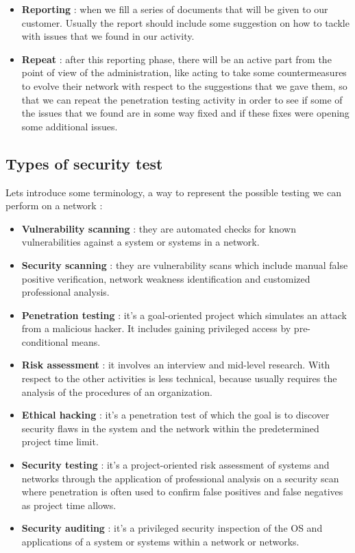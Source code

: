 \documentclass[11pt]{article}
\begin{document}
\begin{itemize}
\item \textbf{Reporting} : when we fill a series of documents that will be given to our customer. Usually the report should include some suggestion on how to tackle with issues that we found in our activity. 
\item \textbf{Repeat} : after this reporting phase, there will be an active part from the point of view of the administration, like acting to take some countermeasures to evolve their network with respect to the suggestions that we gave them, so that we can repeat the penetration testing activity in order to see if some of the issues that we found are in some way fixed and if these fixes were opening some additional issues.
\end{itemize}
\subsection{Types of security test}
Lets introduce some terminology, a way to represent the possible testing we can perform on a network :
\begin{itemize}
\item \textbf{Vulnerability scanning} : they are automated checks for known vulnerabilities against a system or systems in a network.
\item \textbf{Security scanning} : they are vulnerability scans which include manual false positive verification, network weakness identification and customized professional analysis.
\item \textbf{Penetration testing} : it's a goal-oriented project which simulates an attack from a malicious hacker. It includes gaining privileged access by pre-conditional means.
\item \textbf{Risk assessment} : it involves an interview and mid-level research. With respect to the other activities is less technical, because usually requires the analysis of the procedures of an organization.
\item \textbf{Ethical hacking} : it's a penetration test of which the goal is to discover security flaws in the system and the network within the predetermined project time limit.
\item \textbf{Security testing} : it's a project-oriented risk assessment of systems and networks through the application of professional analysis on a security scan where penetration is often used to confirm false positives and false negatives as project time allows.
\item \textbf{Security auditing} : it's a privileged security inspection of the OS and applications of a system or systems within a network or networks.
\end{itemize}
\end{document}
